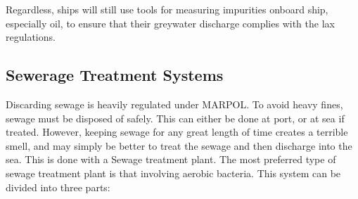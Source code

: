 \documentclass[11pt,a4paper]{article}
\begin{document}
Regardless, ships will still use tools for measuring impurities onboard ship, especially oil, to ensure that their greywater discharge complies with the lax regulations.
\subsection{Sewerage Treatment Systems}
Discarding sewage is heavily regulated under MARPOL. To avoid heavy fines, sewage must be disposed of safely. This can either be done at port, or at sea if treated. However, keeping sewage for any great length of time creates a terrible smell, and may simply be better to treat the sewage and then discharge into the sea. This is done with a Sewage treatment plant. The most preferred type of sewage treatment plant is that involving aerobic bacteria. This system can be divided into three parts:
\end{document}
